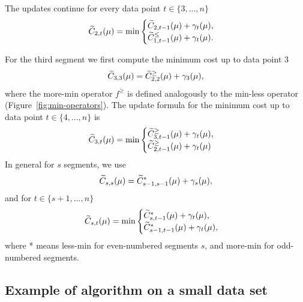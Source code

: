\documentclass{article}
\begin{document}
The updates continue for every data point $t\in\{3, ..., n\}$
\begin{equation*}
  \widetilde{C}_{2,t}(\mu) = \min
  \begin{cases}
    \widetilde{C}_{2,t-1}(\mu) + \gamma_t(\mu),\\
    \widetilde{C}_{1,t-1}^{\leq}(\mu) + \gamma_t(\mu).
  \end{cases}
\end{equation*}

For the third segment we first compute the minimum cost up to data point 3
\begin{equation*}
  \widetilde{C}_{3,3}(\mu) = \widetilde{C}_{2,2}^{\geq}(\mu) + \gamma_3(\mu),
\end{equation*}
where the more-min operator $f^\geq$ is defined analogously to the
min-less operator (Figure~\ref{fig:min-operators}). The update formula
for the minimum cost up to data point $t\in\{4, ..., n\}$ is
\begin{equation*}
  \widetilde{C}_{3,t}(\mu) = \min
  \begin{cases}
    \widetilde{C}_{3,t-1}^{\geq}(\mu)+\gamma_t(\mu),\\
    \widetilde{C}_{2,t-1}^{\geq}(\mu)+\gamma_t(\mu)
  \end{cases}
\end{equation*}
In general for $s$ segments, we use
\begin{equation}
  \widetilde{C}_{s,s}(\mu) = \widetilde{C}_{s-1,s-1}^{*}(\mu) + \gamma_s(\mu),
\end{equation}
and for $t\in\{s+1, ..., n\}$
\begin{equation}
  \widetilde{C}_{s,t}(\mu) = \min
  \begin{cases}
    \widetilde{C}_{s,t-1}^{*}(\mu)+\gamma_t(\mu),\\
    \widetilde{C}_{s-1,t-1}^{*}(\mu)+\gamma_t(\mu),
  \end{cases}
\end{equation}
where * means less-min for even-numbered segments $s$, and more-min
for odd-numbered segments.

\subsection{Example of algorithm on a small data set}
\end{document}
